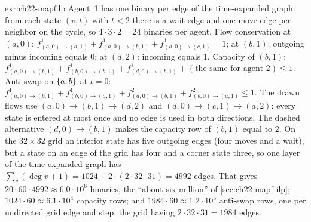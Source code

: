 \begin{solution}{exr:ch22-mapfilp}
Agent~1 has one binary per edge of the time-expanded graph: from each
state $(v,t)$ with $t < 2$ there is a wait edge and one move edge per
neighbor on the cycle, so $4 \cdot 3 \cdot 2 = 24$ binaries per agent.
Flow conservation at $(a,0)$: $f^1_{(a,0)\to(a,1)} + f^1_{(a,0)\to(b,1)}
+ f^1_{(a,0)\to(c,1)} = 1$; at $(b,1)$: outgoing minus incoming equals
$0$; at $(d,2)$: incoming equals $1$. Capacity of $(b,1)$:
$f^1_{(a,0)\to(b,1)} + f^1_{(b,0)\to(b,1)} + f^1_{(d,0)\to(b,1)} +
(\text{the same for agent }2) \le 1$. Anti-swap on $\left\{ a,b \right\}$ at $t = 0$:
$f^1_{(a,0)\to(b,1)} + f^1_{(b,0)\to(a,1)} + f^2_{(a,0)\to(b,1)} +
f^2_{(b,0)\to(a,1)} \le 1$. The drawn flows use $(a,0)\to(b,1)\to(d,2)$ and
$(d,0)\to(c,1)\to(a,2)$: every state is entered at most once and no edge is
used in both directions. The dashed alternative $(d,0)\to(b,1)$ makes the
capacity row of $(b,1)$ equal to $2$. On the $32 \times 32$ grid an interior state has five
outgoing edges (four moves and a wait), but a state on an edge of the grid
has four and a corner state three, so one layer of the time-expanded graph
has $\sum_v (\deg v + 1) = 1024 + 2 \cdot (2 \cdot 32 \cdot 31) = 4992$
edges. That gives $20 \cdot 60 \cdot 4992 \approx 6.0 \cdot 10^6$ binaries,
the ``about six million'' of \cref{sec:ch22-mapf-ilp}; $1024 \cdot 60
\approx 6.1 \cdot 10^4$ capacity rows; and $1984 \cdot 60 \approx 1.2 \cdot
10^5$ anti-swap rows, one per undirected grid edge and step, the grid
having $2 \cdot 32 \cdot 31 = 1984$ edges.
\end{solution}

